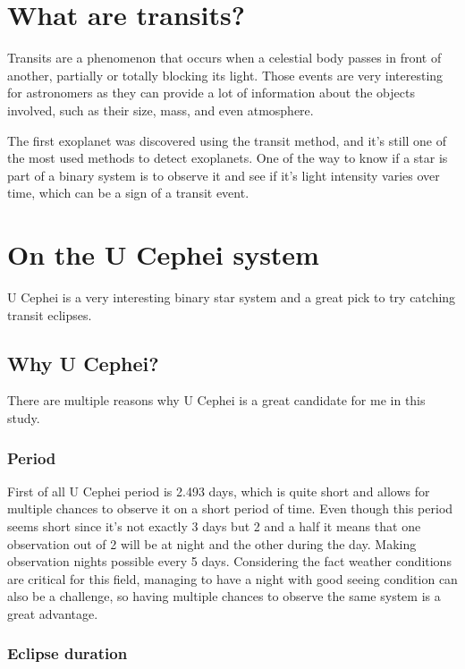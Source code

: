 \documentclass[12pt,a4paper]{article}
\begin{document}
\section{What are transits?}

Transits are a phenomenon that occurs when a celestial body passes in front of another, partially or totally blocking its light.
Those events are very interesting for astronomers as they can provide a lot of information about the objects involved, such as their size, mass, and even atmosphere.

The first exoplanet was discovered using the transit method, and it's still one of the most used methods to detect exoplanets.
One of the way to know if a star is part of a binary system is to observe it and see if it's light intensity varies over time, which can be a sign of a transit event.

\section{On the U Cephei system}

U Cephei is a very interesting binary star system and a great pick to try catching transit eclipses. 

\subsection{Why U Cephei?}

There are multiple reasons why U Cephei is a great candidate for me in this study.

\subsubsection{Period}

First of all U Cephei period is 2.493 days, which is quite short and allows for multiple chances to observe it on a short period of time. 
Even though this period seems short since it's not exactly 3 days but 2 and a half it means that one observation out of 2 will be at night and the other during the day.
Making observation nights possible every 5 days.
Considering the fact weather conditions are critical for this field, managing to have a night with good seeing condition can also be a challenge, so having multiple chances to observe the same system is a great advantage.

\subsubsection{Eclipse duration}
\end{document}
